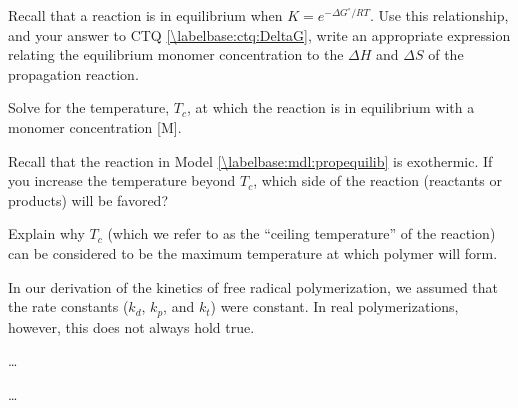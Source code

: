 \begin{activity}
\begin{ctqs}
	\question Recall that a reaction is in equilibrium when $K = e^{-\Delta G^\circ/RT}$.  Use this relationship, and your answer to CTQ \ref{\labelbase:ctq:DeltaG}, write an appropriate expression relating the equilibrium monomer concentration to the $\Delta H$ and $\Delta S$ of the propagation reaction.
	
	\question Solve for the temperature, $T_c$, at which the reaction is in equilibrium with a monomer concentration [M].
	
	\question Recall that the reaction in Model \ref{\labelbase:mdl:propequilib} is exothermic.  If you increase the temperature beyond $T_c$, which side of the reaction (reactants or products) will be favored?

	\question Explain why $T_c$ (which we refer to as the ``ceiling temperature'' of the reaction) can be considered to be the maximum temperature at which polymer will form.

\end{ctqs}



\begin{model}
\label{\labelbase:mdl:rxnrates}

	In our derivation of the kinetics of free radical polymerization, we assumed that the rate constants ($k_d$, $k_p$, and $k_t$) were constant.  In real polymerizations, however, this does not always hold true.
	
	\dots
	

\end{model}

\begin{ctqs}

	\question 
		
\end{ctqs}


\begin{exercises}

	\exercise \dots
	
\end{exercises}


%
%	


	
\end{activity}